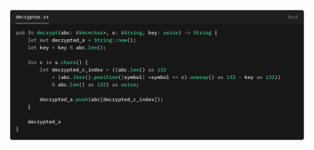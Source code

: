 \documentclass[a4paper]{report}
\begin{document}
\includegraphics[width=1\textwidth]{images/caesars_cipher_decryptor.png}
\end{document}
